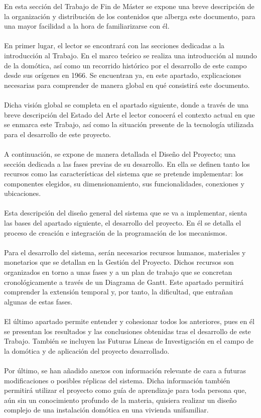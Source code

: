 En esta sección del Trabajo de Fin de Máster se expone una breve descripción de la organización y distribución de los contenidos que alberga este documento, para una mayor facilidad a la hora de familiarizarse con él.\\\\
En primer lugar, el lector se encontrará con las secciones dedicadas a la introducción al Trabajo. En el marco teórico se realiza una introducción al mundo de la domótica, así como un recorrido histórico por el desarrollo de este campo desde sus orígenes en 1966. Se encuentran ya, en este apartado, explicaciones necesarias para comprender de manera global en qué consistirá este documento. \\\\
Dicha visión global se completa en el apartado siguiente, donde a través de una breve descripción del Estado del Arte el lector conocerá el contexto actual en que se enmarca este Trabajo, así como la situación presente de la tecnología utilizada para el desarrollo de este proyecto.\\\\
A continuación, se expone de manera detallada el Diseño del Proyecto; una sección dedicada a las fases previas de su desarrollo. En ella se definen tanto los recursos como las características del sistema que se pretende implementar: los componentes elegidos, su dimensionamiento, sus funcionalidades, conexiones y ubicaciones.\\\\
Esta descripción del diseño general del sistema que se va a implementar, sienta las bases del apartado siguiente, el desarrollo del proyecto. En él se detalla el proceso de creación e integración de la programación de los mecanismos. \\\\
Para el desarrollo del sistema, serán necesarios recursos humanos, materiales y monetarios que se detallan en la Gestión del Proyecto. Dichos recursos son organizados en torno a unas fases y a un plan de trabajo que se concretan cronológicamente a través de un Diagrama de Gantt. Este apartado permitirá comprender la extensión temporal y, por tanto, la dificultad, que entrañan algunas de estas fases.\\\\
El último apartado permite entender y cohesionar todos los anteriores, pues en él se presentan los resultados y las conclusiones obtenidas tras el desarrollo de este Trabajo. También se incluyen las Futuras Líneas de Investigación en el campo de la domótica y de aplicación del proyecto desarrollado.\\\\
Por último, se han añadido anexos con información relevante de cara a futuras modificaciones o posibles réplicas del sistema. Dicha información también permitirá utilizar el proyecto como guía de aprendizaje para toda persona que, aún sin un conocimiento profundo de la materia, quisiera realizar un diseño complejo de una instalación domótica en una vivienda unifamiliar.
